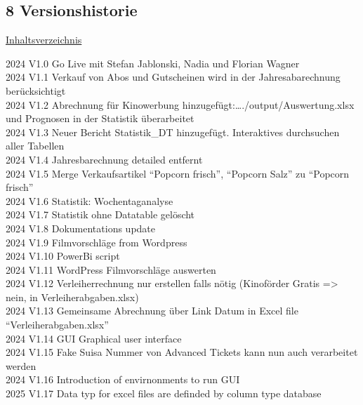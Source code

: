 \documentclass[
]{article}
\begin{document}
\newpage

\subsection{8 Versionshistorie}\label{versionshistorie}

\hyperref[Inhaltsverzeichnis]{Inhaltsverzeichnis}

2024 V1.0 Go Live mit Stefan Jablonski, Nadia und Florian Wagner\\
2024 V1.1 Verkauf von Abos und Gutscheinen wird in der Jahresabarechnung
berücksichtigt\\
2024 V1.2 Abrechnung für Kinowerbung
hinzugefügt:\ldots./output/Auswertung.xlsx und Prognosen in der
Statistik überarbeitet\\
2024 V1.3 Neuer Bericht Statistik\_DT hinzugefügt. Interaktives
durchsuchen aller Tabellen\\
2024 V1.4 Jahresbarechnung detailed entfernt\\
2024 V1.5 Merge Verkaufsartikel ``Popcorn frisch'', ``Popcorn Salz'' zu
``Popcorn frisch''\\
2024 V1.6 Statistik: Wochentaganalyse\\
2024 V1.7 Statistik ohne Datatable gelöscht\\
2024 V1.8 Dokumentations update\\
2024 V1.9 Filmvorschläge from Wordpress\\
2024 V1.10 PowerBi script\\
2024 V1.11 WordPress Filmvorschläge auswerten\\
2024 V1.12 Verleiherrechnung nur erstellen falls nötig (Kinoförder
Gratis =\textgreater{} nein, in Verleiherabgaben.xlsx)\\
2024 V1.13 Gemeinsame Abrechnung über Link Datum in Excel file
``Verleiherabgaben.xlsx''\\
2024 V1.14 GUI Graphical user interface\\
2024 V1.15 Fake Suisa Nummer von Advanced Tickets kann nun auch
verarbeitet werden\\
2024 V1.16 Introduction of envirnonments to run GUI\\
2025 V1.17 Data typ for excel files are definded by column type
database\\
\end{document}
